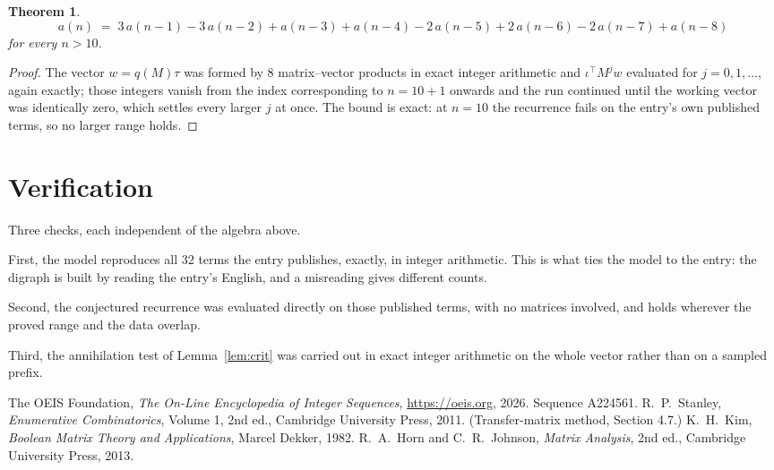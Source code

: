 \documentclass[11pt,a4paper]{article}
\theoremstyle{plain}
\newtheorem{theorem}{Theorem}
\theoremstyle{definition}
\begin{document}
\begin{theorem}
\[
a(n)\;=\;3\,a(n-1) - 3\,a(n-2) + a(n-3) + a(n-4) - 2\,a(n-5) + 2\,a(n-6) - 2\,a(n-7) + a(n-8)
\]
for every $n>10$.
\end{theorem}

\begin{proof}
The vector $w=q(M)\tau$ was formed by $8$ matrix--vector products in exact integer
arithmetic and $\iota^{\!\top}M^{j}w$ evaluated for $j=0,1,\dots$, again exactly; those
integers vanish from the index corresponding to $n=10+1$ onwards and the run continued
until the working vector was identically zero, which settles every larger $j$ at once. The bound is exact: at $n=10$ the recurrence fails on the entry's own published terms, so no larger range holds.
\end{proof}

\section{Verification}

Three checks, each independent of the algebra above.

First, the model reproduces all $32$ terms the entry publishes, exactly, in integer
arithmetic. This is what ties the model to the entry: the digraph is built by reading the
entry's English, and a misreading gives different counts.

Second, the conjectured recurrence was evaluated directly on those published terms, with no
matrices involved, and holds wherever the proved range and the data overlap.

Third, the annihilation test of Lemma~\ref{lem:crit} was carried out in exact integer
arithmetic on the whole vector rather than on a sampled prefix.

\begin{thebibliography}{9}
 The OEIS Foundation, \emph{The On-Line Encyclopedia of Integer
Sequences}, \url{https://oeis.org}, 2026. Sequence A224561.
 R.~P.~Stanley, \emph{Enumerative Combinatorics}, Volume 1, 2nd ed.,
Cambridge University Press, 2011. (Transfer-matrix method, Section 4.7.)
 K.~H.~Kim, \emph{Boolean Matrix Theory and Applications}, Marcel Dekker,
1982.
 R.~A.~Horn and C.~R.~Johnson, \emph{Matrix Analysis}, 2nd ed., Cambridge
University Press, 2013.
\end{thebibliography}
\end{document}
